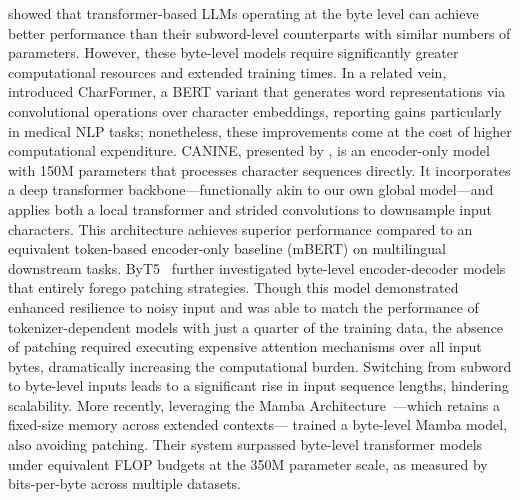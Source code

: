\cite{Choe2019BridgingTG} showed that transformer-based LLMs operating at the byte level can achieve better performance than their subword-level counterparts with similar numbers of parameters. However, these byte-level models require significantly greater computational resources and extended training times. In a related vein, \cite{el2020characterbert} introduced CharFormer, a BERT variant that generates word representations via convolutional operations over character embeddings, reporting gains particularly in medical NLP tasks; nonetheless, these improvements come at the cost of higher computational expenditure. CANINE, presented by \cite{clark2022canine}, is an encoder-only model with 150M parameters that processes character sequences directly. It incorporates a deep transformer backbone—functionally akin to our own global model—and applies both a local transformer and strided convolutions to downsample input characters. This architecture achieves superior performance compared to an equivalent token-based encoder-only baseline (mBERT) on multilingual downstream tasks. ByT5~\citep{xue2022byt5} further investigated byte-level encoder-decoder models that entirely forego patching strategies. Though this model demonstrated enhanced resilience to noisy input and was able to match the performance of tokenizer-dependent models with just a quarter of the training data, the absence of patching required executing expensive attention mechanisms over all input bytes, dramatically increasing the computational burden. Switching from subword to byte-level inputs leads to a significant rise in input sequence lengths, hindering scalability. More recently, leveraging the Mamba Architecture~\citep{gu2023mamba}—which retains a fixed-size memory across extended contexts—\cite{wang2024mambabyte} trained a byte-level Mamba model, also avoiding patching. Their system surpassed byte-level transformer models under equivalent FLOP budgets at the 350M parameter scale, as measured by bits-per-byte across multiple datasets.

